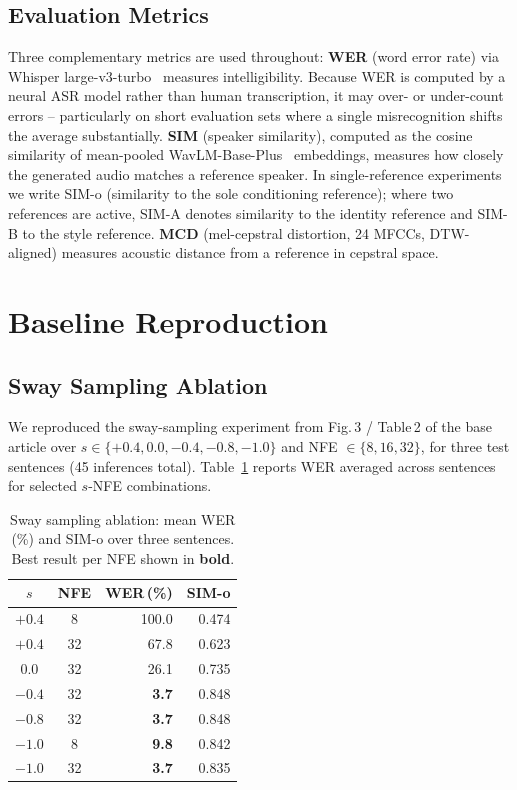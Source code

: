 \documentclass[11pt,a4paper,twocolumn]{article}
\begin{document}
\subsection{Evaluation Metrics}
\label{sec:metrics}

Three complementary metrics are used throughout:
\textbf{WER} (word error rate) via Whisper large-v3-turbo~\cite{radford2023whisper}
measures intelligibility.  Because WER is computed by a neural ASR
model rather than human transcription, it may over- or under-count
errors -- particularly on short evaluation sets where a single
misrecognition shifts the average substantially.
\textbf{SIM} (speaker similarity), computed as the cosine similarity of
mean-pooled WavLM-Base-Plus~\cite{chen2022wavlm} embeddings, measures
how closely the generated audio matches a reference speaker.
In single-reference experiments we write SIM-o (similarity to the sole
conditioning reference); where two references are active, SIM-A denotes
similarity to the identity reference and SIM-B to the style reference.
\textbf{MCD} (mel-cepstral distortion, 24 MFCCs, DTW-aligned) measures
acoustic distance from a reference in cepstral space.

\section{Baseline Reproduction}
\label{sec:baseline}

\subsection{Sway Sampling Ablation}

We reproduced the sway-sampling experiment from Fig.\,3 / Table\,2 of the
base article over $s \in \{+0.4, 0.0, -0.4, -0.8, -1.0\}$ and
NFE $\in \{8, 16, 32\}$, for three test sentences (45 inferences total).
Table~\ref{tab:sway} reports WER averaged across sentences for selected
$s$-NFE combinations.

\begin{table}[htbp]
\centering
\caption{Sway sampling ablation: mean WER (\%) and SIM-o over
three sentences. Best result per NFE shown in \textbf{bold}.}
\label{tab:sway}
\setlength{\tabcolsep}{4pt}
\begin{tabular}{@{}ccrr@{}}
\toprule
$s$ & NFE & WER\,(\%) & SIM-o  \\
\midrule
$+0.4$ & 8  & 100.0 & 0.474 \\
$+0.4$ & 32 & 67.8 & 0.623  \\
$0.0$  & 32 & 26.1 & 0.735  \\
$-0.4$ & 32 & \textbf{3.7} & 0.848  \\
$-0.8$ & 32 & \textbf{3.7} & 0.848  \\
$-1.0$ & 8  & \textbf{9.8} & 0.842  \\
$-1.0$ & 32 & \textbf{3.7} & 0.835  \\
\bottomrule
\end{tabular}
\end{table}
\end{document}
